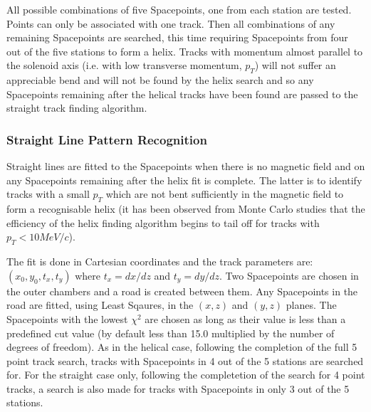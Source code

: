    All possible combinations of five Spacepoints, one from each station are tested. Points can only be associated with one track. Then all combinations of any remaining Spacepoints are searched, this time requiring Spacepoints from four out of the five stations to form a helix. Tracks with momentum almost parallel to the solenoid axis (i.e. with low transverse momentum, $p_T$) will not suffer an appreciable bend and will not be found by the helix search and so any Spacepoints remaining after the helical tracks have been found are passed to the straight track finding algorithm.

    \subsubsection{Straight Line Pattern Recognition}
    \label{subsubsec:StraightLinePatternRecognition}

    Straight lines are fitted to the Spacepoints when there is no magnetic field and on any Spacepoints remaining after the helix fit is complete. The latter is to identify tracks with a small $p_T$ which are not bent sufficiently in the magnetic field to form a recognisable helix (it has been observed from Monte Carlo studies that the efficiency of the helix finding algorithm begins to tail off for tracks with $p_T < 10 MeV/c$).

    The fit is done in Cartesian coordinates and the track parameters are: $(x_0, y_0, t_x, t_y)$ where $t_x = dx/dz$ and $t_y = dy/dz$. Two Spacepoints are chosen in the outer chambers and a road is created between them. Any Spacepoints in the road are fitted, using Least Sqaures, in the $(x,z)$ and $(y,z)$ planes. The Spacepoints with the lowest $\chi^2$ are chosen as long as their value is less than a predefined cut value (by default less than 15.0 multiplied by the number of degrees of freedom). As in the helical case, following the completion of the full 5 point track search, tracks with Spacepoints in 4 out of the 5 stations are searched for. For the straight case only, following the completetion of the search for 4 point tracks, a search is also made for tracks with Spacepoints in only 3 out of the 5 stations. 

